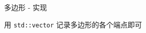 \begin{frame}{多边形 - 实现}
	\label{basic2d:ssec:polygon}

	用 \verb|std::vector| 记录多边形的各个端点即可

\end{frame}
